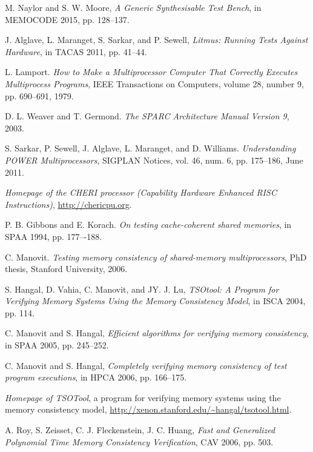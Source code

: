 \documentclass[11pt]{article}
\begin{document}
\begin{thebibliography}{99}
\setlength{\itemsep}{1pt}

 M. Naylor and S. W. Moore, \emph{A Generic
Synthesisable Test Bench}, in MEMOCODE 2015, pp. 128--137.

 J. Alglave, L. Maranget, S. Sarkar, and P.
Sewell, \emph{Litmus: Running Tests Against Hardware}, in TACAS 2011,
pp. 41--44.

 L. Lamport.  \emph{How to Make a Multiprocessor Computer
That Correctly Executes Multiprocess Programs}, IEEE Transactions on
Computers, volume 28, number 9, pp. 690--691, 1979.

 D. L. Weaver and T. Germond. \emph{ The SPARC
Architecture Manual Version 9}, 2003.

 S. Sarkar, P. Sewell, J.  Alglave, L. Maranget, and D.
Williams. \emph{Understanding POWER Multiprocessors}, SIGPLAN Notices,
vol. 46, num. 6, pp. 175--186, June 2011.

 \emph{Homepage of the CHERI processor (Capability
Hardware Enhanced RISC Instructions)}, \url{http://chericpu.org}.

 P. B.  Gibbons and E. Korach.  \emph{On testing
cache-coherent shared memories}, in SPAA 1994, pp.  177–-188.

 C. Manovit. \emph{Testing memory consistency of
shared-memory multiprocessors}, PhD thesis, Stanford University, 2006.

 S. Hangal, D. Vahia, C. Manovit, and JY. J. Lu,
\emph{TSOtool: A Program for Verifying Memory Systems Using the Memory
Consistency Model}, in ISCA 2004, pp. 114.

 C. Manovit and S. Hangal, \emph{Efficient
algorithms for verifying memory consistency}, in SPAA 2005, pp.
245--252.

 C. Manovit and S. Hangal, \emph{Completely
verifying memory consistency of test program executions}, in HPCA
2006, pp. 166--175.

 \emph{Homepage of TSOTool}, a program for verifying
memory systems using the memory consistency model,
\url{http://xenon.stanford.edu/~hangal/tsotool.html}.

 A. Roy, S. Zeisset, C. J. Fleckenstein, J. C.
Huang, \emph{Fast and Generalized Polynomial Time Memory Consistency
Verification}, CAV 2006, pp. 503.%


\end{thebibliography}
\end{document}

